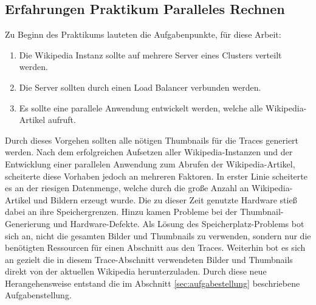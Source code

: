 \subsection{Erfahrungen Praktikum Paralleles Rechnen}
\label{sec:erfahrungen}

Zu Beginn des Praktikums lauteten die Aufgabenpunkte, für diese Arbeit:
\begin{enumerate}
\item Die Wikipedia Instanz sollte auf mehrere Server eines Clusters verteilt werden.
\item Die Server sollten durch einen Load Balancer verbunden werden.
\item Es sollte eine parallele Anwendung entwickelt werden, welche alle Wikipedia-Artikel aufruft.
\end{enumerate}
Durch dieses Vorgehen sollten alle nötigen Thumbnails für die Traces generiert werden. Nach dem erfolgreichen Aufsetzen aller Wikipedia-Instanzen und der Entwicklung einer parallelen Anwendung zum Abrufen der Wikipedia-Artikel, scheiterte diese Vorhaben jedoch an mehreren Faktoren. In erster Linie scheiterte es an der riesigen Datenmenge, welche durch die große Anzahl an Wikipedia-Artikel und Bildern erzeugt wurde. Die zu dieser Zeit genutzte Hardware stieß dabei an ihre Speichergrenzen. Hinzu kamen Probleme bei der Thumbnail-Generierung und Hardware-Defekte. Als Lösung des Speicherplatz-Problems bot sich an, nicht die gesamten Bilder und Thumbnails zu verwenden, sondern nur die benötigten Ressourcen für einen Abschnitt aus den Traces. Weiterhin bot es sich an gezielt die in diesem Trace-Abschnitt verwendeten Bilder und Thumbnails direkt von der aktuellen Wikipedia herunterzuladen. Durch diese neue Herangehensweise entstand die im Abschnitt \ref{sec:aufgabestellung} beschriebene Aufgabenstellung.

